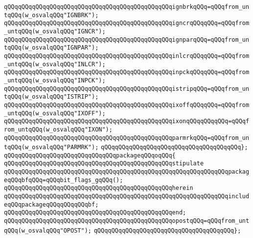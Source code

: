 \verb|qQQqqQQqqQQqqQQqqQQqqQQqqQQqqQQqqQQqqQQqqQQqqQQqignbrkqQQq=qQQqfrom_untqQQq(w_osvalqQQq"IGNBRK");|\newline
\verb|qQQqqQQqqQQqqQQqqQQqqQQqqQQqqQQqqQQqqQQqqQQqqQQqigncrqQQqqQQq=qQQqfrom_untqQQq(w_osvalqQQq"IGNCR");|\newline
\verb|qQQqqQQqqQQqqQQqqQQqqQQqqQQqqQQqqQQqqQQqqQQqqQQqignparqQQq=qQQqfrom_untqQQq(w_osvalqQQq"IGNPAR");|\newline
\verb|qQQqqQQqqQQqqQQqqQQqqQQqqQQqqQQqqQQqqQQqqQQqqQQqinlcrqQQqqQQq=qQQqfrom_untqQQq(w_osvalqQQq"INLCR");|\newline
\verb|qQQqqQQqqQQqqQQqqQQqqQQqqQQqqQQqqQQqqQQqqQQqqQQqinpckqQQqqQQq=qQQqfrom_untqQQq(w_osvalqQQq"INPCK");|\newline
\verb|qQQqqQQqqQQqqQQqqQQqqQQqqQQqqQQqqQQqqQQqqQQqqQQqistripqQQq=qQQqfrom_untqQQq(w_osvalqQQq"ISTRIP");|\newline
\verb|qQQqqQQqqQQqqQQqqQQqqQQqqQQqqQQqqQQqqQQqqQQqqQQqixoffqQQqqQQq=qQQqfrom_untqQQq(w_osvalqQQq"IXOFF");|\newline
\verb|qQQqqQQqqQQqqQQqqQQqqQQqqQQqqQQqqQQqqQQqqQQqqQQqixonqQQqqQQqqQQq=qQQqfrom_untqQQq(w_osvalqQQq"IXON");|\newline
\verb|qQQqqQQqqQQqqQQqqQQqqQQqqQQqqQQqqQQqqQQqqQQqqQQqparmrkqQQq=qQQqfrom_untqQQq(w_osvalqQQq"PARMRK");|\newline
\verb|qQQqqQQqqQQqqQQqqQQqqQQqqQQqqQQqqQQqqQQq};|\newline
\newline
\verb|qQQqqQQqqQQqqQQqqQQqqQQqqQQqqQQqpackageqQQqoqQQq{|\newline
\newline
\verb|qQQqqQQqqQQqqQQqqQQqqQQqqQQqqQQqqQQqqQQqqQQqqQQqstipulate|\newline
\verb|qQQqqQQqqQQqqQQqqQQqqQQqqQQqqQQqqQQqqQQqqQQqqQQqqQQqqQQqqQQqqQQqpackageqQQqbfqQQq=qQQqbit_flags_gqQQq();|\newline
\verb|qQQqqQQqqQQqqQQqqQQqqQQqqQQqqQQqqQQqqQQqqQQqqQQqherein|\newline
\verb|qQQqqQQqqQQqqQQqqQQqqQQqqQQqqQQqqQQqqQQqqQQqqQQqqQQqqQQqqQQqqQQqincludeqQQqpackageqQQqqQQqqQQqbf;|\newline
\verb|qQQqqQQqqQQqqQQqqQQqqQQqqQQqqQQqqQQqqQQqqQQqqQQqend;|\newline
\newline
\verb|qQQqqQQqqQQqqQQqqQQqqQQqqQQqqQQqqQQqqQQqqQQqqQQqopostqQQq=qQQqfrom_untqQQq(w_osvalqQQq"OPOST");|\newline
\verb|qQQqqQQqqQQqqQQqqQQqqQQqqQQqqQQqqQQqqQQq};|\newline
